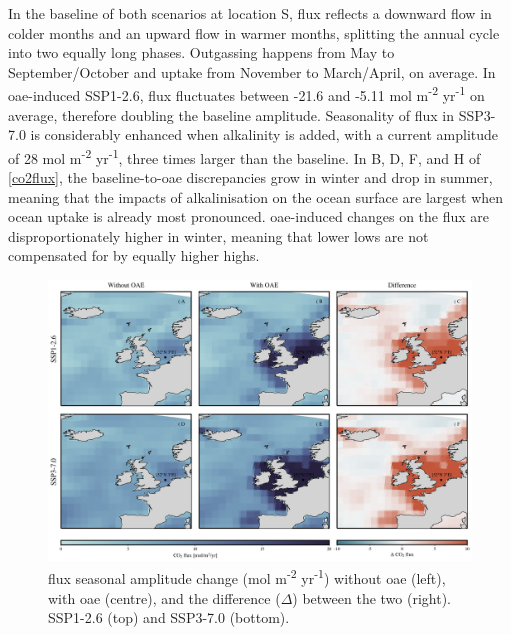 In the baseline of both scenarios at location S,  flux reflects a downward flow in colder months and an upward flow in warmer months, splitting the annual cycle into two equally long phases. Outgassing happens from May to September/October and uptake from November to March/April, on average. In \ac{oae}-induced SSP1-2.6,  flux fluctuates between -21.6 and -5.11 mol m\textsuperscript{-2} yr\textsuperscript{-1} on average, therefore doubling the baseline amplitude. Seasonality of  flux in SSP3-7.0 is considerably enhanced when alkalinity is added, with a current amplitude of 28 mol m\textsuperscript{-2} yr\textsuperscript{-1}, three times larger than the baseline. In B, D, F, and H of \cref{co2flux}, the baseline-to-\ac{oae} discrepancies grow in winter and drop in summer, meaning that the impacts of alkalinisation on the ocean surface are largest when ocean uptake is already most pronounced. \ac{oae}-induced changes on the  flux are disproportionately higher in winter, meaning that lower lows are not compensated for by equally higher highs.

\begin{figure}[H]
\caption[ flux seasonal amplitude change]{ flux seasonal amplitude change (mol m\textsuperscript{-2} yr\textsuperscript{-1}) without \ac{oae} (left), with \ac{oae} (centre), and the difference ($\Delta$) between the two (right). SSP1-2.6 (top) and SSP3-7.0 (bottom).}
\label{co2fluxamplitude}
\centering
\includegraphics[width=15cm]{fig/3_Results/CO2flux/co2flux_ampl.png}

\end{figure}

